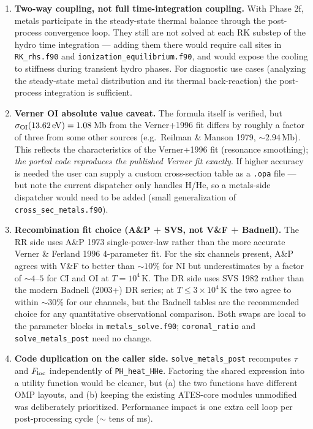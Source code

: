 \documentclass[english,a4paper]{my_memo}
\begin{document}
\begin{enumerate}
\item \textbf{Two-way coupling, not full time-integration coupling.}
With Phase 2f, metals participate in the steady-state thermal balance
through the post-process convergence loop. They still are not solved
at each RK substep of the hydro time integration --- adding them
there would require call sites in \texttt{RK\_rhs.f90} and
\texttt{ionization\_equilibrium.f90}, and would expose the cooling
to stiffness during transient hydro phases. For diagnostic use cases
(analyzing the steady-state metal distribution and its thermal
back-reaction) the post-process integration is sufficient.

\item \textbf{Verner OI absolute value caveat.} The formula itself is
verified, but $\sigma_{\rm OI}(13.62\,\mathrm{eV}) = 1.08\,$Mb from the
Verner+1996 fit differs by roughly a factor of three from some other
sources (e.g.\ Reilman \& Manson 1979, $\sim 2.94\,$Mb). This reflects the
characteristics of the Verner+1996 fit (resonance smoothing); \emph{the
ported code reproduces the published Verner fit exactly}. If higher
accuracy is needed the user can supply a custom cross-section table as a
\texttt{.opa} file --- but note the current dispatcher only handles
H/He, so a metals-side dispatcher would need to be added (small
generalization of \texttt{cross\_sec\_metals.f90}).

\item \textbf{Recombination fit choice (A\&P + SVS, not V\&F + Badnell).}
The RR side uses A\&P 1973 single-power-law rather than the more
accurate Verner \& Ferland 1996 4-parameter fit. For the six channels
present, A\&P agrees with V\&F to better than $\sim 10\%$ for NI but
underestimates by a factor of $\sim 4$--$5$ for CI and OI at
$T = 10^4\,$K. The DR side uses SVS 1982 rather than the modern
Badnell (2003+) DR series; at $T \le 3 \times 10^4\,$K the two agree
to within $\sim 30\%$ for our channels, but the Badnell tables are
the recommended choice for any quantitative observational comparison.
Both swaps are local to the parameter blocks in
\texttt{metals\_solve.f90}; \texttt{coronal\_ratio} and
\texttt{solve\_metals\_post} need no change.

\item \textbf{Code duplication on the caller side.}
\texttt{solve\_metals\_post} recomputes $\tau$ and $F_{\rm loc}$
independently of \texttt{PH\_heat\_HHe}. Factoring the shared expression
into a utility function would be cleaner, but (a) the two functions have
different OMP layouts, and (b) keeping the existing ATES-core modules
unmodified was deliberately prioritized. Performance impact is one extra
cell loop per post-processing cycle ($\sim$ tens of ms).
\end{enumerate}
\end{document}
